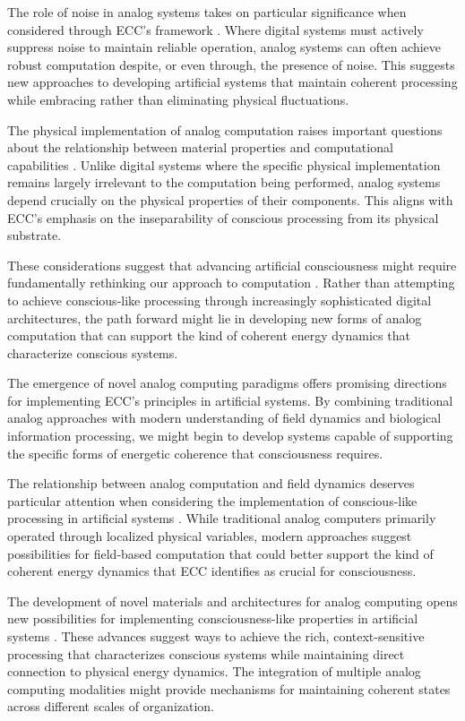 \begin{refsection}
The role of noise in analog systems takes on particular significance when considered through ECC's framework \cite{Davies2019}. Where digital systems must actively suppress noise to maintain reliable operation, analog systems can often achieve robust computation despite, or even through, the presence of noise. This suggests new approaches to developing artificial systems that maintain coherent processing while embracing rather than eliminating physical fluctuations.

The physical implementation of analog computation raises important questions about the relationship between material properties and computational capabilities \cite{Dewdney1984}. Unlike digital systems where the specific physical implementation remains largely irrelevant to the computation being performed, analog systems depend crucially on the physical properties of their components. This aligns with ECC's emphasis on the inseparability of conscious processing from its physical substrate.

These considerations suggest that advancing artificial consciousness might require fundamentally rethinking our approach to computation \cite{Earman1993}. Rather than attempting to achieve conscious-like processing through increasingly sophisticated digital architectures, the path forward might lie in developing new forms of analog computation that can support the kind of coherent energy dynamics that characterize conscious systems.

The emergence of novel analog computing paradigms offers promising directions for implementing ECC's principles in artificial systems. By combining traditional analog approaches with modern understanding of field dynamics and biological information processing, we might begin to develop systems capable of supporting the specific forms of energetic coherence that consciousness requires.

The relationship between analog computation and field dynamics deserves particular attention when considering the implementation of conscious-like processing in artificial systems \cite{Ambainis2015}. While traditional analog computers primarily operated through localized physical variables, modern approaches suggest possibilities for field-based computation that could better support the kind of coherent energy dynamics that ECC identifies as crucial for consciousness.

The development of novel materials and architectures for analog computing opens new possibilities for implementing consciousness-like properties in artificial systems \cite{Thompson2009}. These advances suggest ways to achieve the rich, context-sensitive processing that characterizes conscious systems while maintaining direct connection to physical energy dynamics. The integration of multiple analog computing modalities might provide mechanisms for maintaining coherent states across different scales of organization.


\end{refsection}
